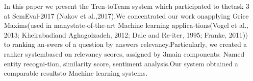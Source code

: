 In   this   paper   we                                 present               the Tren-toTeam  system  which participated  to  thetask  3  at  SemEval-2017                                (Nakov et al.,2017).We concentrated  our  work  onapplying   Grice   Maxims(used   in manystate-of-the-art Machine learning applica-tions(Vogel  et  al.,  2013; Kheirabadiand  Aghagolzadeh,  2012;  Dale  and Re-iter, 1995;  Franke, 2011))                                to              ranking  an-swers of a question by answers relevancy.Particularly, we  created  a                                ranker                    systembased on relevancy scores, assigned by 3main components:  Named entity recogni-tion,  similarity score,  sentiment analysis.Our system obtained a comparable resultsto Machine learning systems.

